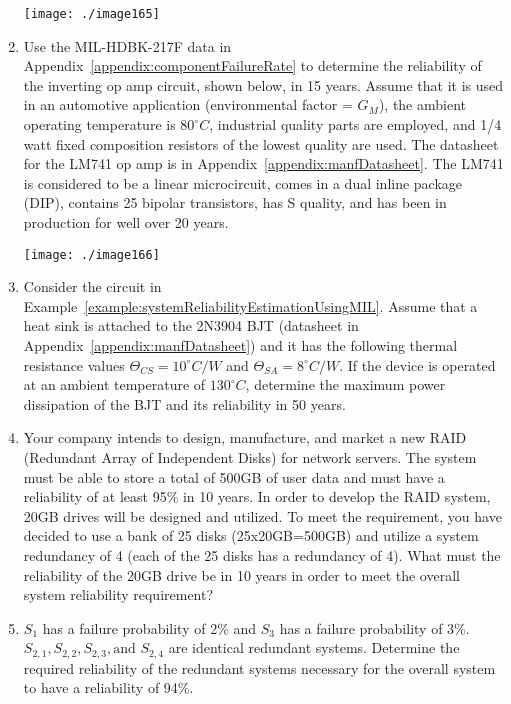 \begin{enumerate}
\texttt{[image: ./image165]}

\item
  Use the MIL-HDBK-217F data in 
  Appendix~\ref{appendix:componentFailureRate} to determine the reliability
  of the inverting op amp circuit, shown below, in 15 years. Assume that
  it is used in an automotive application (environmental factor =
 $G_M$), the ambient operating temperature is
$80^\circ C$, industrial quality parts are employed, and 1/4
  watt fixed composition resistors of the lowest quality are used. The
  datasheet for the LM741 op amp is in Appendix~\ref{appendix:manfDatasheet}. 
  The LM741 is
  considered to be a linear microcircuit, comes in a dual inline package
  (DIP), contains 25 bipolar transistors, has S quality, and has been in
  production for well over 20 years.

\texttt{[image: ./image166]}

\item
  Consider the circuit in Example~\ref{example:systemReliabilityEstimationUsingMIL}. 
  Assume that a heat sink is
  attached to the 2N3904 BJT (datasheet in 
  Appendix~\ref{appendix:manfDatasheet}) and it has the
  following thermal resistance values
$\Theta_{CS} = 10^\circ C/W$ and $\Theta_{SA} = 8 ^\circ C/W$. 
If the device is operated at
  an ambient temperature of $130^\circ C$, determine the maximum power
  dissipation of the BJT and its reliability in 50 years.
\item
  Your company intends to design, manufacture, and market a new RAID
  (Redundant Array of Independent Disks) for network servers. The system
  must be able to store a total of 500GB of user data and must have a
  reliability of at least 95\% in 10 years. In order to develop the RAID
  system, 20GB drives will be designed and utilized. To meet the
  requirement, you have decided to use a bank of 25 disks
  (25x20GB=500GB) and utilize a system redundancy of 4 (each of the 25
  disks has a redundancy of 4). What must the reliability of the 20GB
  drive be in 10 years in order to meet the overall system reliability
  requirement?
  
  
\item
  $S_1$ has a failure probability of  2\% and $S_3$ has a failure
  probability of 3\%. $S_{2,1}, S_{2,2}, S_{2,3}, \text{and } S_{2,4}$   
   are identical redundant
  systems. Determine the required reliability of the redundant systems
  necessary for the overall system to have a reliability of 94\%.


\end{enumerate}
